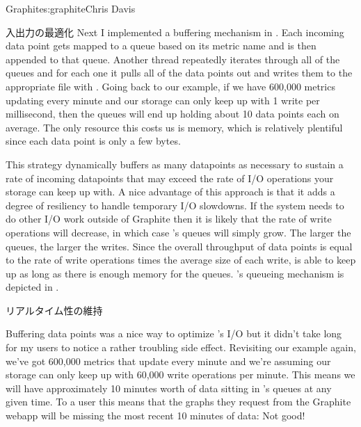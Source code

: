 \begin{aosachapter}{Graphite}{s:graphite}{Chris Davis}
\begin{aosasect1}{入出力の最適化}
Next I implemented a buffering mechanism in . Each incoming data
point gets mapped to a queue based on its metric name and is then
appended to that queue.  Another thread repeatedly iterates through
all of the queues and for each one it pulls all of the data points out
and writes them to the appropriate  file with
. Going back to our example, if we have 600,000
metrics updating every minute and our storage can only keep up with 1
write per millisecond, then the queues will end up holding about 10
data points each on average. The only resource this costs us is
memory, which is relatively plentiful since each data point is only a
few bytes.

This strategy dynamically buffers as many datapoints as necessary to sustain
a rate of incoming datapoints that may exceed the rate of I/O operations your
storage can keep up with. A nice advantage of this approach is that it adds a degree of
resiliency to handle temporary I/O slowdowns. If the system needs to
do other I/O work outside of Graphite then it is likely that the rate
of write operations will decrease, in which case 's queues will
simply grow. The larger the queues, the larger the writes. Since the
overall throughput of data points is equal to the rate of write
operations times the average size of each write,  is able to
keep up as long as there is enough memory for the queues.  's
queueing mechanism is depicted in .


\end{aosasect1}

\begin{aosasect1}{リアルタイム性の維持}

Buffering data points was a nice way to optimize 's I/O but it
didn't take long for my users to notice a rather troubling side
effect.  Revisiting our example again, we've got 600,000 metrics that
update every minute and we're assuming our storage can only keep up
with 60,000 write operations per minute. This means we will have
approximately 10 minutes worth of data sitting in 's queues at
any given time.  To a user this means that the graphs they request
from the Graphite webapp will be missing the most recent 10 minutes of
data: Not good!


\end{aosasect1}
\end{aosachapter}
